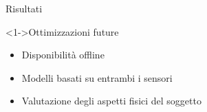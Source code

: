 \begin{tframe}{Risultati}
\begin{minipage}{0.50\textwidth}
    \end{minipage}%

    \begin{block}<1->{Ottimizzazioni future}
        
        \begin{itemize}
            \item Disponibilità offline
            \item Modelli basati su entrambi i sensori 
            \item Valutazione degli aspetti fisici del soggetto
        \end{itemize}
        
    \end{block}

\end{tframe}